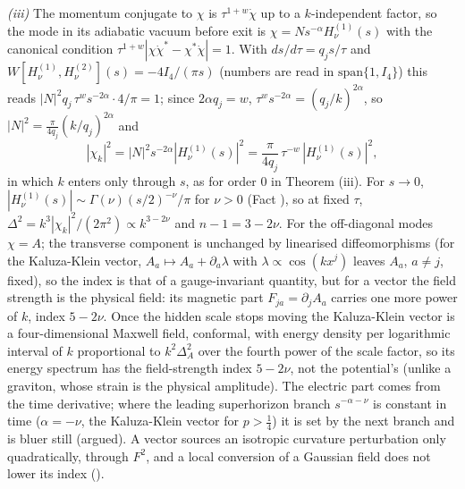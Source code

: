 \emph{(iii)} The momentum conjugate to $\chi$ is $\tau^{1 + w}\dot\chi$ up to a $k$-independent factor, so the mode in its adiabatic vacuum before exit is $\chi = Ns^{-\alpha}H^{(1)}_{\nu}(s)$ with the canonical condition $\tau^{1 + w}|\chi\dot\chi^{*} - \chi^{*}\dot\chi| = 1$. With $ds/d\tau = q_{j}s/\tau$ and $W[H^{(1)}_{\nu}, H^{(2)}_{\nu}](s) = -4I_{4}/(\pi s)$ (numbers are read in $\mathrm{span}\{1, I_{4}\}$) this reads $|N|^{2}q_{j}\,\tau^{w}s^{-2\alpha}\cdot 4/\pi = 1$; since $2\alpha q_{j} = w$, $\tau^{w}s^{-2\alpha} = (q_{j}/k)^{2\alpha}$, so $|N|^{2} = \tfrac{\pi}{4q_{j}}(k/q_{j})^{2\alpha}$ and
\[
|\chi_{k}|^{2} = |N|^{2}s^{-2\alpha}|H^{(1)}_{\nu}(s)|^{2} = \frac{\pi}{4q_{j}}\,\tau^{-w}\,|H^{(1)}_{\nu}(s)|^{2},
\]
in which $k$ enters only through $s$, as for order $0$ in Theorem (iii). For $s \to 0$, $|H^{(1)}_{\nu}(s)| \sim \Gamma(\nu)(s/2)^{-\nu}/\pi$ for $\nu > 0$ (Fact ), so at fixed $\tau$, $\Delta^{2} = k^{3}|\chi_{k}|^{2}/(2\pi^{2}) \propto k^{3 - 2\nu}$ and $n - 1 = 3 - 2\nu$. For the off-diagonal modes $\chi = A$; the transverse component is unchanged by linearised diffeomorphisms (for the Kaluza-Klein vector, $A_{a} \mapsto A_{a} + \partial_{a}\lambda$ with $\lambda \propto \cos(kx^{j})$ leaves $A_{a}$, $a \ne j$, fixed), so the index is that of a gauge-invariant quantity, but for a vector the field strength is the physical field: its magnetic part $F_{ja} = \partial_{j}A_{a}$ carries one more power of $k$, index $5 - 2\nu$. Once the hidden scale stops moving the Kaluza-Klein vector is a four-dimensional Maxwell field, conformal, with energy density per logarithmic interval of $k$ proportional to $k^{2}\Delta_{A}^{2}$ over the fourth power of the scale factor, so its energy spectrum has the field-strength index $5 - 2\nu$, not the potential's (unlike a graviton, whose strain is the physical amplitude). The electric part comes from the time derivative; where the leading superhorizon branch $s^{-\alpha - \nu}$ is constant in time ($\alpha = -\nu$, the Kaluza-Klein vector for $p > \tfrac14$) it is set by the next branch and is bluer still (argued). A vector sources an isotropic curvature perturbation only quadratically, through $F^{2}$, and a local conversion of a Gaussian field does not lower its index ().

